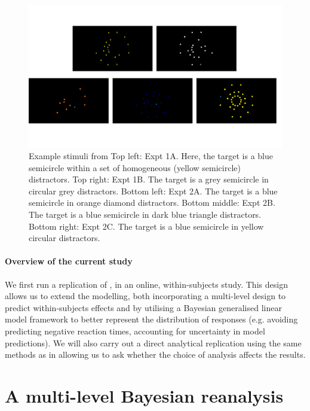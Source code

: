 \documentclass[smallextended]{svjour3}       %
\begin{document}
\begin{figure}
\centering
\includegraphics[width=\textwidth]{../plots/example_stimuli_figure.pdf}
\caption{Example stimuli from \cite{buetti2019predicting} Top left: Expt 1A. Here, the target is a blue semicircle within a set of homogeneous (yellow semicircle) distractors. Top right: Expt 1B. The target is a grey semicircle in circular grey distractors. Bottom left: Expt 2A. The target is a blue semicircle in orange diamond distractors. Bottom middle: Expt 2B. The target is a blue semicircle in dark blue triangle distractors. Bottom right: Expt 2C. The target is a blue semicircle in yellow circular distractors.}
\label{fig:buetti2019_stimulus}
\end{figure}

\paragraph{Overview of the current study}
We first run a replication of \cite{buetti2019predicting}, in an online, within-subjects study. This design allows us to extend the modelling, both incorporating a multi-level design to predict within-subjects effects and by utilising a Bayesian generalised linear model framework to better represent the distribution of responses (e.g. avoiding predicting negative reaction times, accounting for uncertainty in model predictions). We will also carry out a direct analytical replication using the same methods as in \cite{buetti2019predicting} allowing us to ask whether the choice of analysis affects the results.

\section{A multi-level Bayesian reanalysis}
\label{sec:reanalysis}
\end{document}

